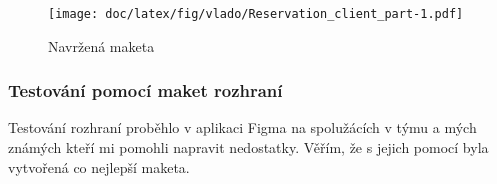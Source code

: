 \newpage
\begin{figure}[h]
    \centering
    \texttt{[image: doc/latex/fig/vlado/Reservation\_client\_part-1.pdf]}
    \caption{Navržená maketa}
    \label{fig:mokcup}
\end{figure}
\newpage

\subsubsection{Testování pomocí maket rozhraní}
Testování rozhraní proběhlo v aplikaci Figma na spolužácích v týmu a mých známých kteří mi
pomohli napravit nedostatky. Věřím, že s jejich pomocí byla vytvořená co nejlepší maketa.

\newpage
